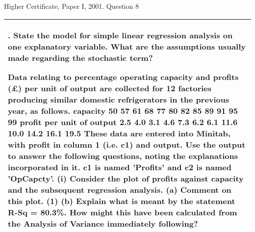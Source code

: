 \documentclass[a4paper,12pt]{article}
\begin{document}
Higher Certificate, Paper I, 2001. Question 8
\begin{table}[ht!]
     \centering
     \begin{tabular}{|p{15cm}|}
     \hline        
\noindent %
8. State the model for simple linear regression analysis on one explanatory variable.
What are the assumptions usually made regarding the stochastic term?

Data relating to percentage operating capacity and profits (£) per unit of output are
collected for 12 factories producing similar domestic refrigerators in the previous
year, as follows.
capacity
50 57 61 68 77 80 82 85 89 91 95 99
profit per unit
of output
2.5 4.0 3.1 4.6 7.3 6.2 6.1 11.6 10.0 14.2 16.1 19.5
These data are entered into Minitab, with profit in column 1 (i.e. c1) and
output. Use the output to answer the following questions, noting the explanations
incorporated in it. c1 is named 'Profits' and c2 is named 'OpCapcty'.
(i) Consider the plot of profits against capacity and the subsequent regression
analysis.
(a) Comment on this plot.
(1)
(b) Explain what is meant by the statement R-Sq = 80.3\%. How might
this have been calculated from the Analysis of Variance
immediately following?
\\ \hline
      \end{tabular}
    \end{table}
\end{document}
